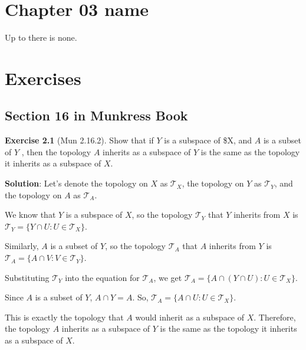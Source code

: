 \documentclass[
]{book}
\theoremstyle{definition}
\theoremstyle{definition}
\theoremstyle{definition}
\newtheorem{exercise}{Exercise}[chapter]
\theoremstyle{definition}
\theoremstyle{remark}
\begin{document}
\hypertarget{chapter-03-name}{%
\chapter{Chapter 03 name}\label{chapter-03-name}}

Up to there is none.

\hypertarget{exercises}{%
\chapter{Exercises}\label{exercises}}

\hypertarget{section-16-in-munkress-book}{%
\section{Section 16 in Munkress Book}\label{section-16-in-munkress-book}}

\begin{exercise}[Mun 2.16.2]
\protect\hypertarget{exr:unnamed-chunk-90}{}\label{exr:unnamed-chunk-90}Show that if \(Y\) is a subspace of \$X, and \(A\) is a subset of \(Y\) , then the topology \(A\) inherits as a subspace of \(Y\) is the same as the topology it inherits as a subspace of \(X\).
\end{exercise}

\textbf{Solution}:
Let's denote the topology on \(X\) as \(\mathcal{T}_X\), the topology on \(Y\) as \(\mathcal{T}_Y\), and the topology on \(A\) as \(\mathcal{T}_A\).

We know that \(Y\) is a subspace of \(X\), so the topology \(\mathcal{T}_Y\) that \(Y\) inherits from \(X\) is \(\mathcal{T}_Y = \{ Y \cap U : U \in \mathcal{T}_X \}\).

Similarly, \(A\) is a subset of \(Y\), so the topology \(\mathcal{T}_A\) that \(A\) inherits from \(Y\) is \(\mathcal{T}_A = \{ A \cap V : V \in \mathcal{T}_Y \}\).

Substituting \(\mathcal{T}_Y\) into the equation for \(\mathcal{T}_A\), we get \(\mathcal{T}_A = \{ A \cap (Y \cap U) : U \in \mathcal{T}_X \}\).

Since \(A\) is a subset of \(Y\), \(A \cap Y = A\). So, \(\mathcal{T}_A = \{ A \cap U : U \in \mathcal{T}_X \}\).

This is exactly the topology that \(A\) would inherit as a subspace of \(X\). Therefore, the topology \(A\) inherits as a subspace of \(Y\) is the same as the topology it inherits as a subspace of \(X\).
\end{document}
